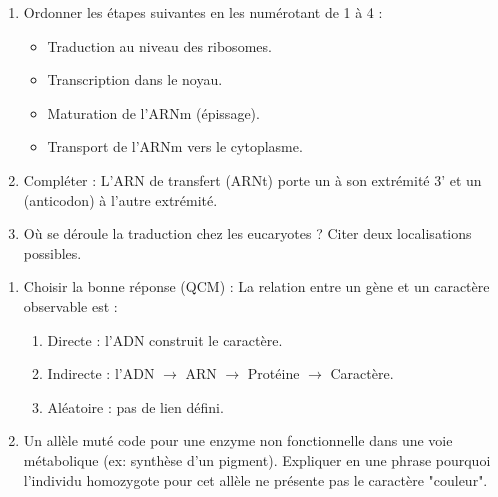 \documentclass[11pt]{article}
\begin{document}
\begin{exercice}
\begin{enumerate}
\item Ordonner les étapes suivantes en les numérotant de 1 à 4 : 
\begin{itemize}
\item Traduction au niveau des ribosomes.
\item Transcription dans le noyau.
\item Maturation de l'ARNm (épissage).
\item Transport de l'ARNm vers le cytoplasme.
\end{itemize}
\item Compléter : L'ARN de transfert (ARNt) porte un \underline{\hspace{3cm}} à son extrémité 3' et un \underline{\hspace{3cm}} (anticodon) à l'autre extrémité.
\item Où se déroule la traduction chez les eucaryotes ? Citer deux localisations possibles.
\end{enumerate}
\end{exercice}

\begin{exercice}
\begin{enumerate}
\item Choisir la bonne réponse (QCM) : La relation entre un gène et un caractère observable est :
\begin{enumerate}
\item Directe : l'ADN construit le caractère.
\item Indirecte : l'ADN $\to$ ARN $\to$ Protéine $\to$ Caractère.
\item Aléatoire : pas de lien défini.
\end{enumerate}
\item Un allèle muté code pour une enzyme non fonctionnelle dans une voie métabolique (ex: synthèse d'un pigment). Expliquer en une phrase pourquoi l'individu homozygote pour cet allèle ne présente pas le caractère "couleur".
\end{enumerate}
\end{exercice}
\end{document}
